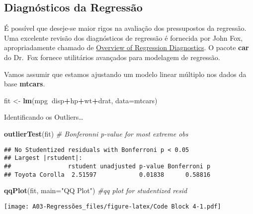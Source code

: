 \documentclass[]{article}
\newenvironment{Shaded}{\begin{snugshade}}{\end{snugshade}}
\newcommand{\CommentTok}[1]{\textcolor[rgb]{0.56,0.35,0.01}{\textit{#1}}}
\newcommand{\DataTypeTok}[1]{\textcolor[rgb]{0.13,0.29,0.53}{#1}}
\newcommand{\KeywordTok}[1]{\textcolor[rgb]{0.13,0.29,0.53}{\textbf{#1}}}
\newcommand{\NormalTok}[1]{#1}
\newcommand{\OperatorTok}[1]{\textcolor[rgb]{0.81,0.36,0.00}{\textbf{#1}}}
\newcommand{\StringTok}[1]{\textcolor[rgb]{0.31,0.60,0.02}{#1}}
\begin{document}
\hypertarget{diagnuxf3sticos-da-regressuxe3o}{%
\subsection{Diagnósticos da
Regressão}\label{diagnuxf3sticos-da-regressuxe3o}}

É possível que deseje-se maior rigos na avaliação dos pressupostos da
regressão. Uma excelente revisão dos diagnósticos de regressão é
fornecida por John Fox, apropriadamente chamado de
\href{http://socserv.socsci.mcmaster.ca/jfox/Courses/Brazil-2009/index.html}{Overview
of Regression Diagnostics}. O pacote \textbf{car} do Dr.~Fox fornece
utilitários avançados para modelagem de regressão.

Vamos assumir que estamos ajustando um modelo linear múltiplo nos dados
da base \textbf{mtcars}.

\begin{Shaded}
\begin{Highlighting}[]
\NormalTok{fit <-}\StringTok{ }\KeywordTok{lm}\NormalTok{(mpg}\OperatorTok{~}\NormalTok{disp}\OperatorTok{+}\NormalTok{hp}\OperatorTok{+}\NormalTok{wt}\OperatorTok{+}\NormalTok{drat, }\DataTypeTok{data=}\NormalTok{mtcars)}
\end{Highlighting}
\end{Shaded}

Identificando os Outliers\ldots{}

\begin{Shaded}
\begin{Highlighting}[]
\KeywordTok{outlierTest}\NormalTok{(fit) }\CommentTok{# Bonferonni p-value for most extreme obs}
\end{Highlighting}
\end{Shaded}

\begin{verbatim}
## No Studentized residuals with Bonferroni p < 0.05
## Largest |rstudent|:
##                rstudent unadjusted p-value Bonferroni p
## Toyota Corolla  2.51597            0.01838      0.58816
\end{verbatim}

\begin{Shaded}
\begin{Highlighting}[]
\KeywordTok{qqPlot}\NormalTok{(fit, }\DataTypeTok{main=}\StringTok{"QQ Plot"}\NormalTok{) }\CommentTok{#qq plot for studentized resid }
\end{Highlighting}
\end{Shaded}

\texttt{[image: A03-Regressões\_files/figure-latex/Code Block 4-1.pdf]}
\end{document}
